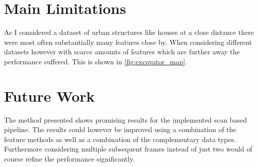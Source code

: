 \section{Main Limitations}{
    As I considered a dataset of urban structures like houses at a close distance there were most often substantially many features close by. When considering different datasets however with scarce amounts of features which are further away the performance suffered. This is shown in \cref{fig:excavator_map}.
}

\section{Future Work}{
    The method presented shows promising results for the implemented scan based pipeline. The results could however be improved using a combination of the feature methods as well as a combination of the complementary data types. Furthermore considering multiple subsequent frames instead of just two would of course refine the performance significantly.
}

